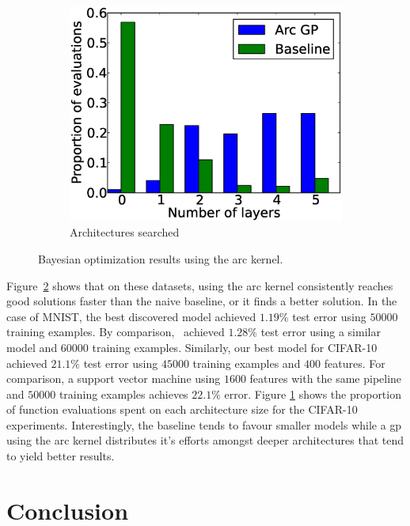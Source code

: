 \documentclass{article}
\newcommand{\gp}{{\sc gp}}
\begin{document}
\begin{figure}[t!]
\begin{subfigure}[]{0.3\textwidth}
		\includegraphics[width=\textwidth]{figures/fevals_per_layer.eps}
		\caption{Architectures searched}
		\label{fig:proparchs}
	\end{subfigure}
	\caption{Bayesian optimization results using the arc kernel.}
	\label{fig:arcbo}
\vspace{-0.3cm}
\end{figure}

Figure~\ref{fig:arcbo} shows that on these datasets, using the arc kernel consistently reaches good solutions faster than the naive baseline, or it finds a better solution. In the case of MNIST, the best discovered model achieved $1.19\%$ test error using $50000$ training examples. By comparison,~\cite{wan2013regularization} achieved $1.28\%$ test error using a similar model and $60000$ training examples. Similarly, our best model for CIFAR-10 achieved $21.1\%$ test error using $45000$ training examples and $400$ features. For comparison, a support vector machine using $1600$ features with the same pipeline and $50000$ training examples achieves $22.1\%$ error. Figure \ref{fig:proparchs} shows the proportion of function evaluations spent on each architecture size for the CIFAR-10 experiments. Interestingly, the baseline tends to favour smaller models while a \gp{} using the arc kernel distributes it's efforts amongst deeper architectures that tend to yield better results.

\section{Conclusion}
\vspace{-0.05in} 
\end{document}

